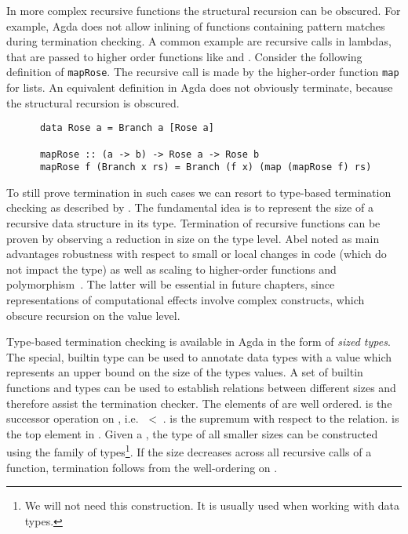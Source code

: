 In more complex recursive functions the structural recursion can be obscured.
For example, Agda does not allow inlining of functions containing pattern
matches during termination checking.
A common example are recursive calls in lambdas, that are passed to higher
order functions like  and \AgdaFunction{>>=}.
Consider the following definition of \texttt{mapRose}.
The recursive call is made by the higher-order function
\texttt{map} for lists.
An equivalent definition in Agda does not obviously terminate, because the
structural recursion is obscured.

\begin{verbatim}
      data Rose a = Branch a [Rose a]

      mapRose :: (a -> b) -> Rose a -> Rose b
      mapRose f (Branch x rs) = Branch (f x) (map (mapRose f) rs)
\end{verbatim}
To still prove termination in such cases we can resort to type-based
termination checking as described by \textcite{DBLP:journals/lmcs/Abel08}.
The fundamental idea is to represent the size of a recursive data structure in
its type.
Termination of recursive functions can be proven by observing a reduction in
size on the type level.
Abel noted as main advantages robustness with respect to small or local changes
in code (which do not impact the type) as well as scaling to higher-order
functions and polymorphism~\cite{DBLP:journals/lmcs/Abel08}.
The latter will be essential in future chapters, since representations of
computational effects involve complex constructs, which obscure recursion on the
value level.

Type-based termination checking is available in Agda in the form of
\textit{sized types}.
The special, builtin type  can be used to annotate data types
with a value which represents an upper bound on the size of the types values.
A set of builtin functions and types can be used to establish relations between
different sizes and therefore assist the termination checker.
The elements of  are well ordered.
 is the successor operation on , i.e.
$\;<\;$\AgdaSpace{}.
 is the supremum with respect to the relation.
 is the top element in .
Given a  , the type of all smaller sizes can
be constructed using the  family of types\footnote{We will
  not need this construction. It is usually used when working with
   data types.}.
If the size decreases across all recursive calls of a function, termination
follows from the well-ordering on .


